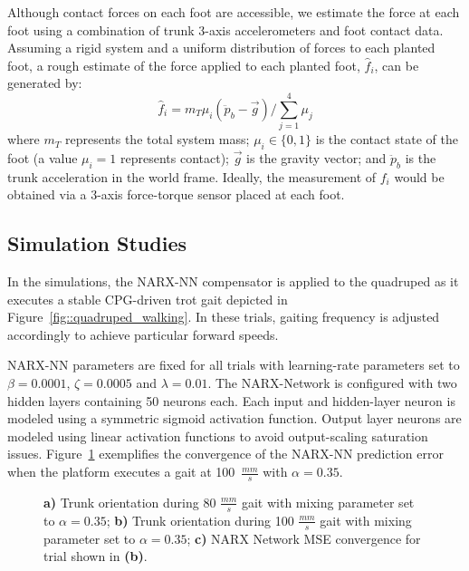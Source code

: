 Although contact forces on each foot are accessible, we estimate the force at each foot using a combination
of trunk 3-axis accelerometers and foot contact data. Assuming a rigid system and a uniform distribution of 
forces to each planted foot, a rough estimate of the force applied to each \Ith planted foot, $\hat{f}_{i}$, can be generated by:
	\vspace{-2mm}
	\begin{equation}
		\hat{f}_{i} = {m_{T}\mu_{i}} \left(\ddot{p}_{b} - \vec{g}\right)/{\sum_{j=1}^{4}{\mu_{j}}}
	\end{equation}
where $m_{T}$ represents the total system mass; $\mu_{i}\in \{0,1\}$ is the contact state of the \Ith
foot (a value $\mu_{i}=1$ represents contact); $\vec{g}$ is the gravity vector; and $\ddot{p}_{b}$ is the trunk
acceleration in the world frame. Ideally, the measurement of ${f}_{i}$ would be obtained via a 3-axis force-torque 
sensor placed at each foot.


\subsection{Simulation Studies}


In the simulations, the NARX-NN compensator is applied to the quadruped as it executes a stable CPG-driven trot gait
depicted in  Figure~\ref{fig::quadruped_walking}. In these trials, gaiting frequency is adjusted accordingly to achieve 
particular forward speeds.

NARX-NN parameters are fixed for all trials with learning-rate  parameters set to $\beta=0.0001$, $\zeta=0.0005$ and $\lambda = 0.01$.
The NARX-Network is configured with two hidden layers containing 50 neurons each. Each input and hidden-layer neuron is 
modeled using a symmetric sigmoid activation function. Output layer neurons are modeled using linear activation functions to 
avoid output-scaling saturation issues. Figure~\ref{fig::fast} exemplifies the convergence of the NARX-NN
prediction error when the platform executes a gait at  100~$\frac{mm}{s}$ with $\alpha = 0.35$.

\begin{figure}[h!]
	\centering
	\begin{subfigure}{0.475\textwidth}
		\centering
		\caption{ }
	\end{subfigure}
	\begin{subfigure}{0.475\textwidth}
		\centering
		\caption{ } 
	\end{subfigure}
	\begin{subfigure}{0.475\textwidth}
		\centering
		\caption{ } 
	\end{subfigure}
	\caption{ 
		\textbf{a)} Trunk orientation during 80 $\frac{mm}{s}$ gait with mixing parameter set to $\alpha = 0.35$;
		\textbf{b)} Trunk orientation during 100 $\frac{mm}{s}$ gait with mixing parameter set to $\alpha = 0.35$;
		\textbf{c)} NARX Network MSE convergence for trial shown in \textbf{(b)}.
	}
	\label{fig::fast}
	\PostImageCloseSpace
\end{figure}


